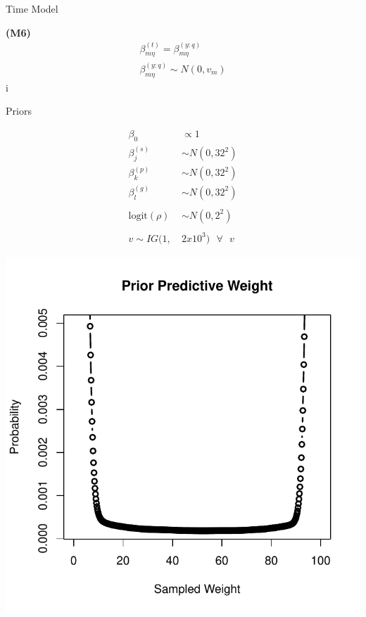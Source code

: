 \documentclass[ xcolor = pdftex, dvipsnames, table ]{beamer}
\begin{document}
\begin{frame}{Time Model}
\begin{minipage}{0.3\textwidth}
\begin{center}
\textbf{(M6)}
\begin{eqnarray*}
&\beta^{(t)}_{m\eta} = \beta^{(y:q)}_{m\eta}&\\
&\beta^{(y:q)}_{m\eta} \sim N(0, v_m)&
\end{eqnarray*}i
\end{center}
\end{minipage}
\end{frame}

%
%

\begin{frame}{Priors}
$~$
\hspace{-0.8cm}
\begin{minipage}{0.55\textwidth}
\begin{align*}
\beta_0 &\propto 1\\
\beta^{(s)}_j &\sim N(0, 32^2)\\
\beta^{(p)}_k &\sim N(0, 32^2)\\
\beta^{(g)}_l &\sim N(0, 32^2)\\
&\\
\text{logit}(\rho) &\sim N(0, 2^2)\\
&\\
v\sim IG(1,~&2x10^{3}) ~~~\forall~~~v 
\end{align*}
\end{minipage}
\begin{minipage}{0.4\textwidth}       
\includegraphics[width=1.4\textwidth]{../pictures/priorPredict.pdf}
\end{minipage}
\end{frame}
\end{document}
